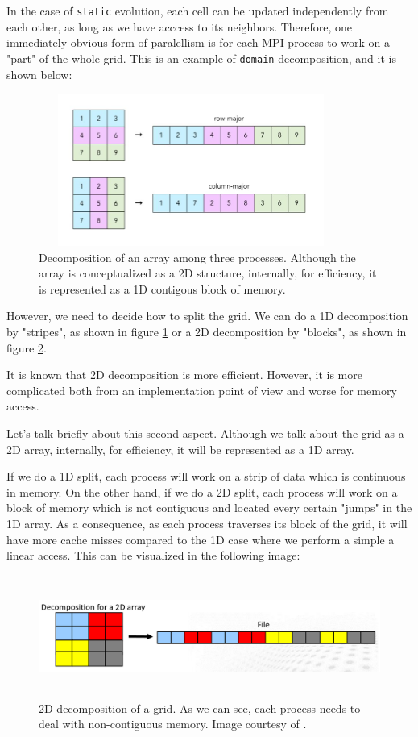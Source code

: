 \documentclass{report}
\begin{document}
In the case of \texttt{static} evolution, each cell can be updated 
independently from each other, as long as we have acccess to its neighbors. 
Therefore, one immediately obvious form of paralellism is for each MPI 
process to work on a "part" of the whole grid. This is an example of \texttt{domain}
decomposition, and it is shown below:

\begin{figure}[H]
\centering
\includegraphics[width=10cm, height=5cm]{./other_images/arraydecomposition.jpg}
\caption{\label{fig:decomposition} Decomposition of an array among three processes. 
Although the array is conceptualized as a 2D structure, internally, for efficiency, 
it is represented as a 1D contigous block of memory.}
\end{figure}

However, we need to decide how to split the grid. We can do a 1D decomposition by 
"stripes", as shown in figure \ref{fig:decomposition} or a 2D decomposition by 
"blocks", as shown in figure \ref{fig:2ddecomposition}. 

It is known that 2D decomposition is more efficient. However, it is more complicated both from an implementation 
point of view and worse for memory access.

Let's talk briefly about this second aspect. Although we talk about the 
grid as a 2D array, internally, for efficiency, it will be represented as a 1D 
array. 

If we do a 1D split, each process will work on a strip of data which is 
continuous in memory. On the other hand, if we do a 2D split, each process will 
work on a block of memory which is not contiguous and located every certain 
"jumps" in the 1D array. As a consequence, as each process traverses its block 
of the grid, it will have more cache misses compared to the 1D case where 
we perform a simple a linear access. This can be visualized in 
the following image:

\begin{figure}[H]
\centering
\includegraphics[width=12cm, height=4cm]{./other_images/2d_decomposition.png}
\caption{\label{fig:2ddecomposition} 2D decomposition of a grid. As we can see, 
each process needs to deal with non-contiguous memory. Image courtesy of \cite{prace}.}
\end{figure}
\end{document}
